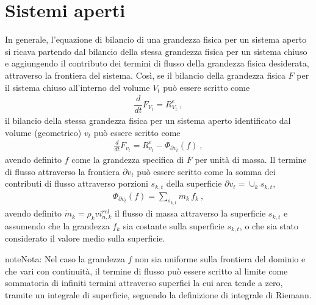 \documentclass[letterpaper,10pt,italian]{jupyterBook}
\begin{document}
\section{Sistemi aperti}
\label{\detokenize{ch/thermodynamics/principles-open:sistemi-aperti}}\label{\detokenize{ch/thermodynamics/principles-open:physics-hs-thermodynamics-foundation-principles-open}}\label{\detokenize{ch/thermodynamics/principles-open::doc}}
\sphinxAtStartPar
In generale, l’equazione di bilancio di una grandezza fisica per un sistema aperto si ricava partendo dal bilancio della stessa grandezza fisica per un sistema chiuso e aggiungendo il contributo dei termini di flusso della grandezza fisica desiderata, attraverso la frontiera del sistema. Così, se il bilancio della grandezza fisica \(F\) per il sistema chiuso all’interno del volume \(V_t\) può essere scritto come
\begin{equation*}
\begin{split}\dfrac{d}{dt} F_{V_t} = R^e_{V_t} \ ,\end{split}
\end{equation*}
\sphinxAtStartPar
il bilancio della stessa grandezza fisica per un sistema aperto identificato dal volume (geometrico) \(v_t\) può essere scritto come
\begin{equation*}
\begin{split}\frac{d}{dt} F_{v_t} = R^e_{v_t} - \Phi_{\partial v_t}(f) \ , \end{split}
\end{equation*}
\sphinxAtStartPar
avendo definito \(f\) come la grandezza specifica di \(F\) per unità di massa. Il termine di flusso attraverso la frontiera \(\partial v_t\) può essere scritto come la somma dei contributi di flusso attraverso porzioni \(s_{k,t}\) della superficie \(\partial v_t = \cup_k s_{k,t}\),
\begin{equation*}
\begin{split}\Phi_{\partial v_t}(f) = \sum_{s_{k,t}} \dot{m}_k \, f_k \ ,\end{split}
\end{equation*}
\sphinxAtStartPar
avendo definito \(\dot{m}_k = \rho_k vi^{rel}_{n,k}\) il flusso di massa attraverso la superficie \(s_{k,t}\) e assumendo che la grandezza \(f_k\) sia costante sulla superficie \(s_{k,t}\), o che sia stato considerato il valore medio sulla superficie.

\begin{sphinxadmonition}{note}{Nota:}
\sphinxAtStartPar
Nel caso la grandezza \(f\) non sia uniforme sulla frontiera del dominio e che vari con continuità, il termine di flusso può essere scritto al limite come sommatoria di infiniti termini attraverso superfici la cui area tende a zero, tramite un integrale di superficie, seguendo la definizione di integrale di Riemann.
\end{sphinxadmonition}
\end{document}
